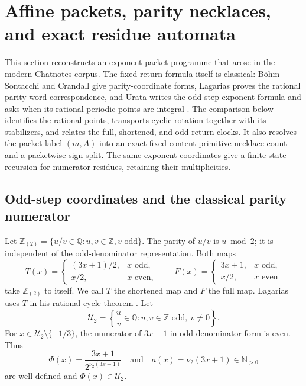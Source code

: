 \section{Affine packets, parity necklaces, and exact residue automata}
\label{sec:affine-packets-residue-automata}

This section reconstructs an exponent-packet programme that arose in the
modern Chatnotes corpus.  The fixed-return formula itself is classical:
B\"ohm--Sontacchi and Crandall give parity-coordinate forms,
Lagarias proves the rational parity-word correspondence, and Urata writes the
odd-step exponent formula and asks when its rational periodic points are
integral
\cite{BohmSontacchi1978,Crandall1978,Lagarias1990,Urata2003}.
The comparison below identifies the rational points, transports cyclic
rotation together with its stabilizers, and relates the full, shortened,
and odd-return clocks.  It also resolves the packet label $(m,A)$ into an
exact fixed-content primitive-necklace count and a packetwise sign split.
The same exponent coordinates give a finite-state recursion for numerator
residues, retaining their multiplicities.

\subsection{Odd-step coordinates and the classical parity numerator}

Let $\mathbb Z_{(2)}=\{u/v\in\mathbb Q:u,v\in\mathbb Z,
v\text{ odd}\}$.  The parity of $u/v$ is $u\bmod2$; it is independent of
the odd-denominator representation.  Both maps
\[
 T(x)=\begin{cases}(3x+1)/2,&x\text{ odd},\\x/2,&x\text{ even},\end{cases}
 \qquad
 F(x)=\begin{cases}3x+1,&x\text{ odd},\\x/2,&x\text{ even}\end{cases}
\]
take $\mathbb Z_{(2)}$ to itself.  We call $T$ the shortened map and $F$
the full map.  Lagarias uses $T$ in his rational-cycle theorem
\cite[(1.1), Theorem~2.1]{Lagarias1990}.  Let
\[
 \mathcal U_2=\left\{\frac uv\in\mathbb Q:
     u,v\in\mathbb Z\text{ odd},\ v\ne0\right\}.
\]
For $x\in\mathcal U_2\setminus\{-1/3\}$, the numerator of $3x+1$
in odd-denominator form is even.  Thus
\[
 \Phi(x)=\frac{3x+1}{2^{\nu_2(3x+1)}}
 \quad\text{and}\quad
 a(x)=\nu_2(3x+1)\in\mathbb N_{>0}
\]
are well defined and $\Phi(x)\in\mathcal U_2$.

